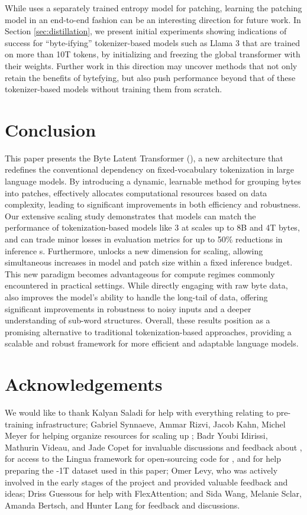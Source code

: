 \documentclass[]{fairmeta}
\begin{document}
While \model{} uses a separately trained entropy model for patching, learning the patching model in an end-to-end fashion can be an interesting direction for future work. In Section \ref{sec:distillation}, we present initial experiments showing indications of success for ``byte-ifying'' tokenizer-based models such as Llama 3 that are trained on more than 10T tokens, by initializing and freezing the global transformer with their weights. Further work in this direction may uncover methods that not only retain the benefits of bytefying, but also push performance beyond that of these tokenizer-based models without training them from scratch. 


\section{Conclusion}
\label{section:conclusion}


This paper presents the Byte Latent Transformer (\modelbf{}), a new architecture that redefines the conventional dependency on fixed-vocabulary tokenization in large language models. By introducing a dynamic, learnable method for grouping bytes into patches, \model{} effectively allocates computational resources based on data complexity, leading to significant improvements in both efficiency and robustness. Our extensive scaling study demonstrates that \model{} models can match the performance of tokenization-based models  like \llama{} 3 at scales up to 8B and 4T bytes, and can trade minor losses in evaluation metrics for up to 50\% reductions in inference \flop{}s. 
Furthermore, \model{} unlocks a new dimension for scaling, allowing simultaneous increases in model and patch size within a fixed inference budget. This new paradigm becomes advantageous for compute regimes commonly encountered in practical settings. 
While directly engaging with raw byte data, \model{} also improves the model's ability to handle the long-tail of data, offering significant improvements in robustness to noisy inputs and a deeper understanding of sub-word structures. 
Overall, these results position \model{} as a promising alternative to traditional tokenization-based approaches, providing a scalable and robust framework for more efficient and adaptable language models.

\section*{Acknowledgements}

We would like to thank Kalyan Saladi for help with everything relating to pre-training infrastructure; Gabriel Synnaeve, Ammar Rizvi, Jacob Kahn, Michel Meyer for helping organize resources for scaling up \model{}; Badr Youbi Idirissi, Mathurin Videau, and Jade Copet for invaluable discussions and feedback about \model{}, for access to the Lingua framework for open-sourcing code for \model{}, and for help preparing the \model{}-1T dataset used in this paper; Omer Levy, who was actively involved in the early stages of the project and provided valuable feedback and ideas; Driss Guessous for help with FlexAttention; and Sida Wang, Melanie Sclar, Amanda Bertsch, and Hunter Lang for feedback and discussions.
\end{document}
